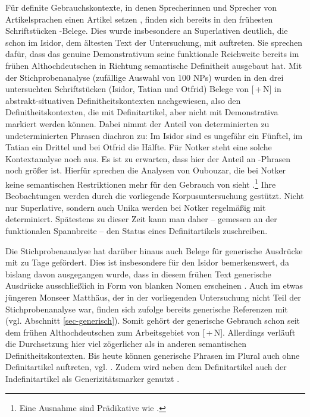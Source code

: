 Für definite Gebrauchskontexte, in denen Sprecherinnen und Sprecher von Artikelsprachen einen Artikel setzen  \parencite[832]{Himmelmann2001}, finden sich bereits in den frühesten Schriftstücken  -Belege. Dies wurde insbesondere an Superlativen deutlich, die schon im Isidor, dem ältesten Text der Untersuchung, mit  auftreten. Sie sprechen dafür, dass das genuine Demonstrativum seine funktionale Reichweite bereits im frühen Althochdeutschen in Richtung semantische Definitheit ausgebaut hat. Mit der Stichprobenanalyse (zufällige Auswahl von 100 NPs) wurden in den drei untersuchten Schriftstücken (Isidor, Tatian und Otfrid) Belege von [\,+\,N] in abstrakt-situativen Definitheitskontexten nachgewiesen, also den Definitheitskontexten, die mit Definitartikel, aber nicht mit Demonstrativa markiert werden können. Dabei nimmt der Anteil von determinierten zu undeterminierten Phrasen diachron zu: Im Isidor sind es ungefähr ein Fünftel, im Tatian ein Drittel und bei Otfrid die Hälfte. Für Notker steht eine solche Kontextanalyse noch aus. Es ist zu erwarten, dass hier der Anteil an -Phrasen noch größer ist. Hierfür sprechen die Analysen von Oubouzar, die bei Notker keine semantischen Restriktionen mehr für den Gebrauch von  sieht \parencite[573]{Oubouzar1989}.\footnote{Eine Ausnahme sind Prädikative wie .} Ihre Beobachtungen werden durch die vorliegende Korpusuntersuchung gestützt. Nicht nur Superlative, sondern auch Unika werden bei Notker regelmäßig mit  determiniert. Spätestens zu dieser Zeit kann man daher -- gemessen an der funktionalen Spannbreite --  den Status eines Definitartikels zuschreiben. 

Die Stichprobenanalyse hat darüber hinaus auch Belege für generische Ausdrücke mit  zu Tage gefördert. Dies ist insbesondere für den Isidor bemerkenswert, da bislang davon ausgegangen wurde, dass in diesem frühen Text generische Ausdrücke ausschließlich in Form von blanken Nomen erscheinen \parencites()()[80]{Oubouzar1992}[145]{Kraiss2012}. Auch im etwas jüngeren Monseer Matthäus, der in der vorliegenden Untersuchung nicht Teil der Stichprobenanalyse war, finden sich \textcite{Hodler1954} zufolge bereits generische Referenzen mit  (vgl. Abschnitt \ref{sec-generisch}). Somit gehört der generische Gebrauch schon seit dem frühen Althochdeutschen zum Arbeitsgebiet von [\,+\,N].  Allerdings verläuft die Durchsetzung hier viel zögerlicher als in anderen semantischen Definitheitskontexten. Bis heute können generische Phrasen im  Plural auch ohne Definitartikel auftreten, vgl.  \parencite[][145]{Barton2015}. Zudem wird neben dem Definitartikel auch der Indefinitartikel als Generizitätsmarker genutzt \parencite{Petrova2020}.

